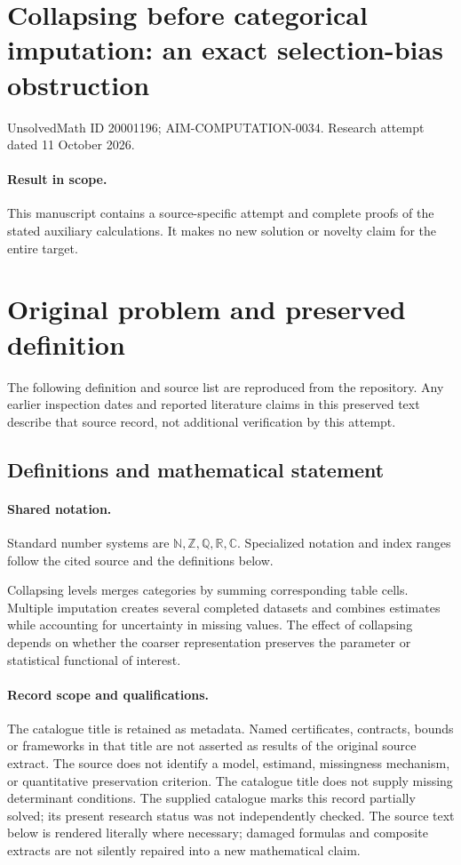 \documentclass[11pt]{article}
\begin{document}
\section*{Collapsing before categorical imputation: an exact selection-bias obstruction}
\noindent UnsolvedMath ID 20001196; AIM-COMPUTATION-0034. Research attempt dated 11 October 2026.
\paragraph{Result in scope.}This manuscript contains a source-specific attempt and complete proofs of the stated auxiliary calculations. It makes no new solution or novelty claim for the entire target.
\section{Original problem and preserved definition}
The following definition and source list are reproduced from the repository. Any earlier inspection dates and reported literature claims in this preserved text describe that source record, not additional verification by this attempt.
\subsection{Definitions and mathematical statement}

\paragraph{Shared notation.}Standard number systems are $\mathbb N,\mathbb Z,\mathbb Q,\mathbb R,\mathbb C$. Specialized notation and index ranges follow the cited source and the definitions below.


Collapsing levels merges categories by summing corresponding table cells. Multiple imputation creates several completed datasets and combines estimates while accounting for uncertainty in missing values. The effect of collapsing depends on whether the coarser representation preserves the parameter or statistical functional of interest.
\paragraph{Record scope and qualifications.}
The catalogue title is retained as metadata. Named certificates, contracts, bounds or frameworks in that title are not asserted as results of the original source extract.
The source does not identify a model, estimand, missingness mechanism, or quantitative preservation criterion. The catalogue title does not supply missing determinant conditions. The supplied catalogue marks this record partially solved; its present research status was not independently checked.
The source text below is rendered literally where necessary; damaged formulas and composite extracts are not silently repaired into a new mathematical claim.
\end{document}
